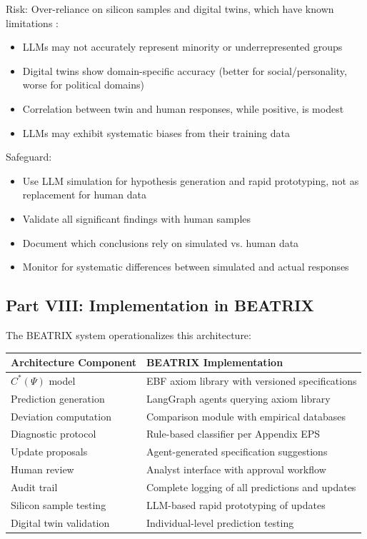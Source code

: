 Risk: Over-reliance on silicon samples and digital twins, which have known 
limitations \citep{bisbee2024, sarstedt2024}:
\begin{itemize}
    \item LLMs may not accurately represent minority or underrepresented groups
    \item Digital twins show domain-specific accuracy (better for social/personality, 
          worse for political domains)
    \item Correlation between twin and human responses, while positive, is modest
    \item LLMs may exhibit systematic biases from their training data
\end{itemize}

Safeguard:
\begin{itemize}
    \item Use LLM simulation for hypothesis generation and rapid prototyping, 
          not as replacement for human data
    \item Validate all significant findings with human samples
    \item Document which conclusions rely on simulated vs. human data
    \item Monitor for systematic differences between simulated and actual responses
\end{itemize}

\subsection{Part VIII: Implementation in BEATRIX}

The BEATRIX system operationalizes this architecture:

\begin{center}
\renewcommand{\arraystretch}{1.3}
\begin{tabular}{|l|l|}
\hline
\textbf{Architecture Component} & \textbf{BEATRIX Implementation} \\
\hline
$C^*(\Psi)$ model & EBF axiom library with versioned specifications \\
Prediction generation & LangGraph agents querying axiom library \\
Deviation computation & Comparison module with empirical databases \\
Diagnostic protocol & Rule-based classifier per Appendix EPS \\
Update proposals & Agent-generated specification suggestions \\
Human review & Analyst interface with approval workflow \\
Audit trail & Complete logging of all predictions and updates \\
Silicon sample testing & LLM-based rapid prototyping of updates \\
Digital twin validation & Individual-level prediction testing \\
\hline
\end{tabular}
\end{center}

